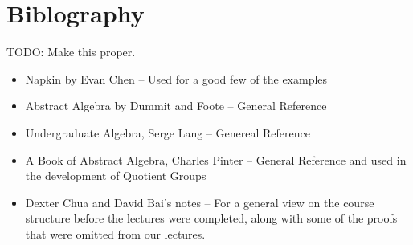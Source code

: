 \documentclass[a4]{scrreprt}
\begin{document}
\clearpage
\chapter*{Biblography}

TODO: Make this proper.

\begin{itemize}
	\item Napkin by Evan Chen -- Used for a good few of the examples
	\item Abstract Algebra by Dummit and Foote -- General Reference
	\item Undergraduate Algebra, Serge Lang -- Genereal Reference
	\item A Book of Abstract Algebra, Charles Pinter -- General Reference and used in the development of Quotient Groups
	\item Dexter Chua and David Bai's notes -- For a general view on the course structure before the lectures were completed, along with some of the proofs that were omitted from our lectures.
\end{itemize}
\end{document}

